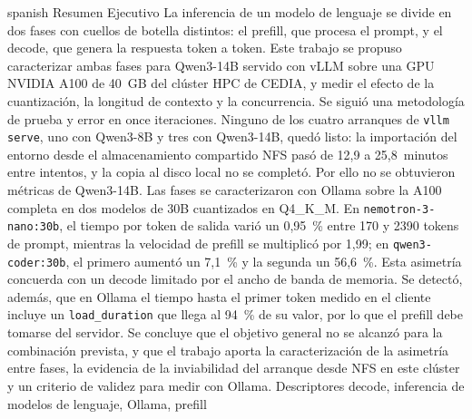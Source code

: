 \UTIResumenPagina
  {spanish}
  {Resumen Ejecutivo}
  {La inferencia de un modelo de lenguaje se divide en dos fases con cuellos de botella distintos: el prefill, que procesa el prompt, y el decode, que genera la respuesta token a token. Este trabajo se propuso caracterizar ambas fases para Qwen3-14B servido con vLLM sobre una GPU NVIDIA A100 de 40~GB del clúster HPC de CEDIA, y medir el efecto de la cuantización, la longitud de contexto y la concurrencia. Se siguió una metodología de prueba y error en once iteraciones. Ninguno de los cuatro arranques de \texttt{vllm serve}, uno con Qwen3-8B y tres con Qwen3-14B, quedó listo: la importación del entorno desde el almacenamiento compartido NFS pasó de 12,9 a 25,8~minutos entre intentos, y la copia al disco local no se completó. Por ello no se obtuvieron métricas de Qwen3-14B. Las fases se caracterizaron con Ollama sobre la A100 completa en dos modelos de 30B cuantizados en Q4\_K\_M. En \texttt{nemotron-3-nano:30b}, el tiempo por token de salida varió un 0,95~\% entre 170 y 2390 tokens de prompt, mientras la velocidad de prefill se multiplicó por 1,99; en \texttt{qwen3-coder:30b}, el primero aumentó un 7,1~\% y la segunda un 56,6~\%. Esta asimetría concuerda con un decode limitado por el ancho de banda de memoria. Se detectó, además, que en Ollama el tiempo hasta el primer token medido en el cliente incluye un \texttt{load\_duration} que llega al 94~\% de su valor, por lo que el prefill debe tomarse del servidor. Se concluye que el objetivo general no se alcanzó para la combinación prevista, y que el trabajo aporta la caracterización de la asimetría entre fases, la evidencia de la inviabilidad del arranque desde NFS en este clúster y un criterio de validez para medir con Ollama.}
  {Descriptores}
  {decode, inferencia de modelos de lenguaje, Ollama, prefill}
